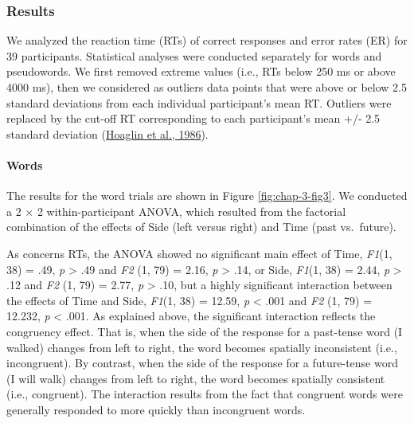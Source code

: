 \documentclass[
  a4paper,12pt,twoside,onecolumn,openright,final,oldfontcommands]{memoir}
\begin{document}
\hypertarget{results}{%
\subsubsection{Results}\label{results}}

We analyzed the reaction time (RTs) of correct responses and error rates (ER) for 39 participants. Statistical analyses were conducted separately for words and pseudowords. We first removed extreme values (i.e., RTs below 250 ms or above 4000 ms), then we considered as outliers data points that were above or below 2.5 standard deviations from each individual participant's mean RT. Outliers were replaced by the cut-off RT corresponding to each participant's mean +/- 2.5 standard deviation (\protect\hyperlink{ref-hoaglin_performance_1986}{Hoaglin et al., 1986}).

\hypertarget{words}{%
\paragraph{Words}\label{words}}

The results for the word trials are shown in Figure \ref{fig:chap-3-fig3}. We conducted a 2 × 2 within-participant ANOVA, which resulted from the factorial combination of the effects of Side (left versus right) and Time (past vs.~future).

As concerns RTs, the ANOVA showed no significant main effect of Time, \emph{F1}(1, 38) = .49, \emph{p} \textgreater{} .49 and \emph{F2} (1, 79) = 2.16, \emph{p} \textgreater{} .14, or Side, \emph{F1}(1, 38) = 2.44, \emph{p} \textgreater{} .12 and \emph{F2} (1, 79) = 2.77, \emph{p} \textgreater{} .10, but a highly significant interaction between the effects of Time and Side, \emph{F1}(1, 38) = 12.59, \emph{p} \textless{} .001 and \emph{F2} (1, 79) = 12.232, \emph{p} \textless{} .001. As explained above, the significant interaction reflects the congruency effect. That is, when the side of the response for a past-tense word (I walked) changes from left to right, the word becomes spatially inconsistent (i.e., incongruent). By contrast, when the side of the response for a future-tense word (I will walk) changes from left to right, the word becomes spatially consistent (i.e., congruent). The interaction results from the fact that congruent words were generally responded to more quickly than incongruent words.
\end{document}
